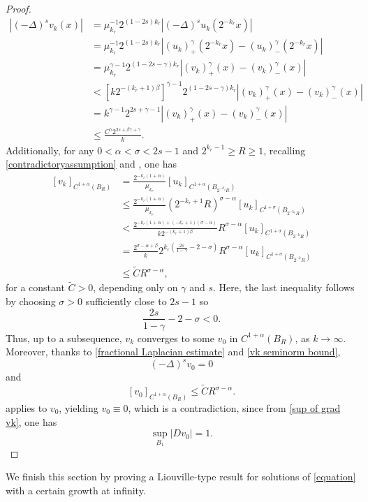 \documentclass[11pt,reqno]{amsart}
\numberwithin{equation}{section}
\numberwithin{theorem}{section}
\numberwithin{lemma}{section}
\numberwithin{corollary}{section}
\numberwithin{remark}{section}
\numberwithin{proposition}{section}
\numberwithin{definition}{section}
\begin{document}
\begin{proof}
   \begin{align}\label{fractional Laplacian estimate}
    |(-\Delta)^{s}v_k(x)|&=\mu_{k_r}^{-1}2^{(1-2s)k_r}|(-\Delta)^s u_k(2^{-k_r}x)|\nonumber\\
    &=\mu_{k_r}^{-1}2^{(1-2s)k_r}\left|(u_k)_+^{\gamma}(2^{-k_r}x)-(u_k)_-^\gamma(2^{-k_r}x)\right|\nonumber\\
    &=\mu_{k_r}^{\gamma-1}2^{(1-2s-\gamma)k_r}\left|(v_k)_+^{\gamma}(x)-(v_k)_-^\gamma(x)\right|\nonumber\\
    &<\left[k2^{-(k_r+1)\beta}\right]^{\gamma-1}2^{(1-2s-\gamma)k_r}\left|(v_k)_+^{\gamma}(x)-(v_k)_-^\gamma(x)\right|\nonumber\\
    &=k^{\gamma-1}2^{2s+\gamma-1}\left|(v_k)_+^{\gamma}(x)-(v_k)_-^\gamma(x)\right|\nonumber\\
    &\le\frac{C^{\gamma}2^{2s+\beta\gamma+\gamma}}{k}.
    \end{align}    
    Additionally, for any $0<\alpha<\sigma<2s-1$ and $2^{k_r-1}\ge R\ge1$, recalling \eqref{contradictoryassumption} and , one has
    \begin{align}\label{vk seminorm bound}
        [v_k]_{C^{1+\alpha}(B_R)}&=\frac{2^{-k_r(1+\alpha)}}{\mu_{k_r}}[u_k]_{C^{1+\alpha}(B_{2^{-k_r}R})}\nonumber\\
        &\le\frac{2^{-k_r(1+\alpha)}}{\mu_{k_r}}(2^{-k_r+1}R)^{\sigma-\alpha}[u_k]_{C^{1+\sigma}(B_{2^{-k_r}R})}\nonumber\\   
        &<\frac{2^{-k_r(1+\alpha)+(-k_r+1)(\sigma-\alpha)}}{k2^{-(k_r+1)\beta}}R^{\sigma-\alpha}[u_k]_{C^{1+\sigma}(B_{2^{-k}R})}\nonumber\\
        &=\frac{2^{\sigma-\alpha+\beta}}{k}2^{k_r\left(\frac{2s}{1-\gamma}-2-\sigma\right)}R^{\sigma-\alpha}[u_k]_{C^{1+\sigma}(B_{2^{-k}R})}\nonumber\\
        &\le\tilde{C}R^{\sigma-\alpha},
    \end{align}
    for a constant $\tilde{C}>0$, depending only on $\gamma$ and $s$. Here, the last inequality follows by choosing $\sigma>0$ sufficiently close to $2s-1$ so
    $$
    \frac{2s}{1-\gamma}-2-\sigma<0.
    $$
    Thus, up to a subsequence, $v_k$ converges to some $v_0$ in $C^{1+\alpha}(B_R)$, as $k\to\infty$. Moreover, thanks to \eqref{fractional Laplacian estimate} and \eqref{vk seminorm bound},
    $$
    (-\Delta)^sv_0=0
    $$
    and
    $$
    [v_0]_{C^{1+\alpha}(B_R)}\le\tilde{C}R^{\sigma-\alpha}.
    $$
     applies to $v_0$, yielding $v_0\equiv0$, which is a contradiction, since from \eqref{sup of grad vk}, one has
    $$
    \sup_{B_{1}}|Dv_0|=1.
    $$
\end{proof}
We finish this section by proving a Liouville-type result for solutions of \eqref{equation} with a certain growth at infinity.
\end{document}
